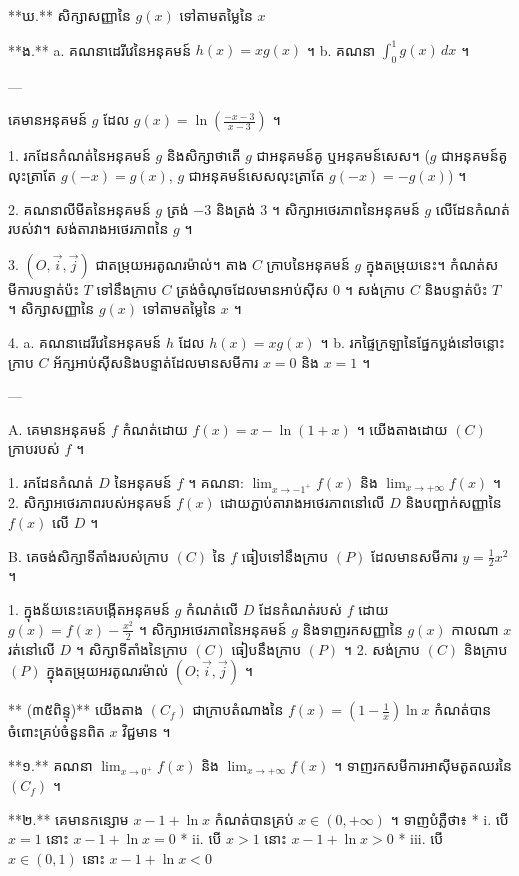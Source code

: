 **ឃ.** សិក្សាសញ្ញានៃ $g(x)$ ទៅតាមតម្លៃនៃ $x$

**ង.** a. គណនាដេរីវេនៃអនុគមន៍ $h(x) = xg(x)$ ។
   b. គណនា $\int_0^1 g(x) \, dx$ ។

---

គេមានអនុគមន៍ $g$ ដែល $g(x) = \ln\left(\frac{-x-3}{x-3}\right) \text{ ។}$

1. រកដែនកំណត់នៃអនុគមន៍ $g$ និងសិក្សាថាតើ $g$ ជាអនុគមន៍គូ ឬអនុគមន៍សេស។ ($g$ ជាអនុគមន៍គូលុះត្រាតែ $g(-x) = g(x)$, $g$ ជាអនុគមន៍សេសលុះត្រាតែ $g(-x) = -g(x)$) ។

2. គណនាលីមីតនៃអនុគមន៍ $g$ ត្រង់ $-3$ និងត្រង់ $3$ ។ សិក្សាអថេរភាពនៃអនុគមន៍ $g$ លើដែនកំណត់របស់វា។ សង់តារាងអថេរភាពនៃ $g$ ។

3. $(O, \vec{i}, \vec{j})$ ជាតម្រុយអរតូណរម៉ាល់។ តាង $C$ ក្រាបនៃអនុគមន៍ $g$ ក្នុងតម្រុយនេះ។ កំណត់សមីការបន្ទាត់ប៉ះ $T$ ទៅនឹងក្រាប $C$ ត្រង់ចំណុចដែលមានអាប់ស៊ីស $0$ ។ សង់ក្រាប $C$ និងបន្ទាត់ប៉ះ $T$ ។
សិក្សាសញ្ញានៃ $g(x)$ ទៅតាមតម្លៃនៃ $x$ ។

4. a. គណនាដេរីវេនៃអនុគមន៍ $h$ ដែល $h(x) = xg(x) \text{ ។}$
   b. រកផ្ទៃក្រឡានៃផ្នែកប្លង់នៅចន្លោះក្រាប $C$ អ័ក្សអាប់ស៊ីសនិងបន្ទាត់ដែលមានសមីការ $x = 0$ និង $x = 1 \text{ ។}$

---

A. គេមានអនុគមន៍ $f$ កំណត់ដោយ $f(x) = x - \ln(1 + x)$ ។ យើងតាងដោយ $(C)$ ក្រាបរបស់ $f$ ។

1. រកដែនកំណត់ $D$ នៃអនុគមន៍ $f$ ។ គណនា: $\lim_{x \to -1^+} f(x)$ និង $\lim_{x \to +\infty} f(x)$ ។
2. សិក្សាអថេរភាពរបស់អនុគមន៍ $f(x)$ ដោយភ្ជាប់តារាងអថេរភាពនៅលើ $D$ និងបញ្ជាក់សញ្ញានៃ $f(x)$ លើ $D$ ។

B. គេចង់សិក្សាទីតាំងរបស់ក្រាប $(C)$ នៃ $f$ ធៀបទៅនឹងក្រាប $(P)$ ដែលមានសមីការ $y = \frac{1}{2}x^2$ ។

1. ក្នុងន័យនេះគេបង្កើតអនុគមន៍ $g$ កំណត់លើ $D$ ដែនកំណត់របស់ $f$ ដោយ $g(x) = f(x) - \frac{x^2}{2}$ ។ សិក្សាអថេរភាពនៃអនុគមន៍ $g$ និងទាញរកសញ្ញានៃ $g(x)$ កាលណា $x$ រត់នៅលើ $D$ ។ សិក្សាទីតាំងនៃក្រាប $(C)$ ធៀបនឹងក្រាប $(P)$ ។
2. សង់ក្រាប $(C)$ និងក្រាប $(P)$ ក្នុងតម្រុយអរតូណរម៉ាល់ $(O; \vec{i}, \vec{j})$ ។



** (៣៥ពិន្ទុ)** យើងតាង $(C_f)$ ជាក្រាបតំណាងនៃ $f(x) = \left(1 - \frac{1}{x}\right)\ln x$ កំណត់បានចំពោះគ្រប់ចំនួនពិត $x$ វិជ្ជមាន ។

**១.** គណនា $\lim_{x \to 0^+} f(x)$ និង $\lim_{x \to +\infty} f(x)$ ។ ទាញរកសមីការអាស៊ីមតូតឈរនៃ $(C_f)$ ។

**២.** គេមានកន្សោម $x - 1 + \ln x$ កំណត់បានគ្រប់ $x \in (0, +\infty)$ ។ ទាញបំភ្លឺថា៖
*   i. បើ $x = 1$ នោះ $x - 1 + \ln x = 0$
*   ii. បើ $x > 1$ នោះ $x - 1 + \ln x > 0$
*   iii. បើ $x \in (0, 1)$ នោះ $x - 1 + \ln x < 0$

